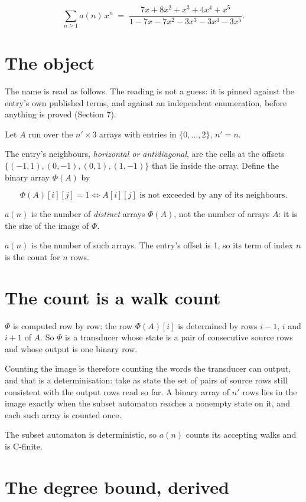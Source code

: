 \documentclass[11pt]{article}
\theoremstyle{definition}
\begin{document}
\[\sum_{n \ge 1} a(n)\,x^n \;=\; \frac{7x + 8x^{2} + x^{3} + 4x^{4} + x^{5}}{1 - 7x - 7x^{2} - 3x^{3} - 3x^{4} - 3x^{5}}.\]

\section{The object}

The name is read as follows. The reading is not a guess: it is pinned against the entry's own published terms, and against an independent enumeration, before anything is proved (Section 7).

Let $A$ run over the $n' \times 3$ arrays with entries in $\{0,\dots,2\}$, $n' = n$.

The entry's neighbours, {\itshape horizontal or antidiagonal}, are the cells at the offsets $\{(-1,1), (0,-1), (0,1), (1,-1)\}$ that lie inside the array. Define the binary array $\Phi(A)$ by

\[\Phi(A)[i][j] = 1 \iff A[i][j] \text{ is not exceeded by any of its neighbours}.\]

$a(n)$ is the number of {\itshape distinct} arrays $\Phi(A)$, not the number of arrays $A$: it is the size of the image of $\Phi$.

$a(n)$ is the number of such arrays. The entry's offset is 1, so its term of index $n$ is the count for $n$ rows.

\section{The count is a walk count}

$\Phi$ is computed row by row: the row $\Phi(A)[i]$ is determined by rows $i-1$, $i$ and $i+1$ of $A$. So $\Phi$ is a transducer whose state is a pair of consecutive source rows and whose output is one binary row.

Counting the image is therefore counting the words the transducer can output, and that is a determinisation: take as state the set of pairs of source rows still consistent with the output rows read so far. A binary array of $n'$ rows lies in the image exactly when the subset automaton reaches a nonempty state on it, and each such array is counted once.

The subset automaton is deterministic, so $a(n)$ counts its accepting walks and is C-finite.

\section{The degree bound, derived}
\end{document}
